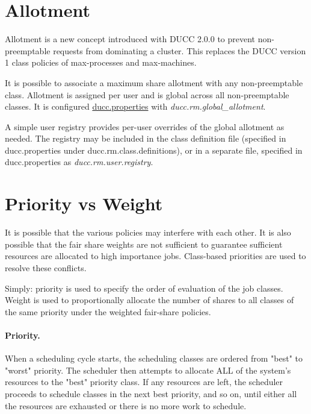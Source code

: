     \section{Allotment}
    \label{sec:rm.allotment}
    
    Allotment is a new concept introduced with DUCC 2.0.0 to prevent non-preemptable 
    requests from dominating a cluster.  This replaces the DUCC version 1 class
    policies of max-processes and max-machines.

    It is possible to associate a maximum share allotment with any non-preemptable class. 
    Allotment is assigned per user and is global across all non-preemptable classes.  It is configured
    \hyperref[sec:ducc.properties]{ducc.properties} with {\em ducc.rm.global\_allotment}.  

    A simple user registry provides per-user overrides of the global allotment as needed.  The
    registry may be included in the class definition file (specified in ducc.properties under
    ducc.rm.class.definitions), or in a separate file, specified in ducc.properties as
    {\em ducc.rm.user.registry}.


    \section{Priority vs Weight}

    It is possible that the various policies may interfere with each other. It is also possible that
    the fair share weights are not sufficient to guarantee sufficient resources are allocated to
    high importance jobs. Class-based priorities are used to resolve these conflicts.

    Simply: priority is used to specify the order of evaluation of the
    job classes. Weight is used to proportionally allocate the number
    of shares to all classes of the same priority under the weighted
    fair-share policies.

    \paragraph{Priority.} 
    
    When a scheduling cycle starts, the scheduling classes are ordered from "best" to "worst" priority. 
    The scheduler then attempts to allocate ALL of the system's resources to the "best" priority class. 
    If any resources are left, the scheduler proceeds to schedule classes in the next best
    priority, and so on, until either all the 
    resources are exhausted or there is no more work to schedule. 
    
